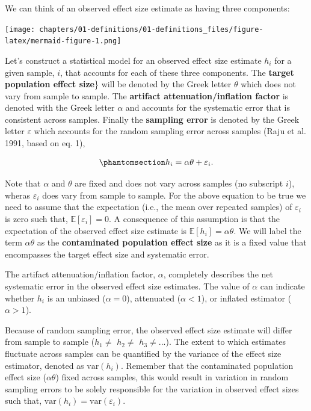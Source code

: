 \documentclass[
  letterpaper,
  DIV=11,
  numbers=noendperiod]{scrreprt}
\begin{document}
We can think of an observed effect size estimate as having three
components:

\texttt{[image: chapters/01-definitions/01-definitions\_files/figure-latex/mermaid-figure-1.png]}

Let's construct a statistical model for an observed effect size estimate
\(h_i\) for a given sample, \(i\), that accounts for each of these three
components. The \textbf{target population effect size}\} will be denoted
by the Greek letter \(\theta\) which does not vary from sample to
sample. The \textbf{artifact attenuation/inflation factor} is denoted
with the Greek letter \(\alpha\) and accounts for the systematic error
that is consistent across samples. Finally the \textbf{sampling error}
is denoted by the Greek letter \(\varepsilon\) which accounts for the
random sampling error across samples (Raju et al. 1991, based on eq. 1),

\begin{equation}\phantomsection\label{eq-model}{
h_i = \alpha \theta + \varepsilon_i.
}\end{equation}

Note that \(\alpha\) and \(\theta\) are fixed and does not vary across
samples (no subscript \(i\)), wheras \(\varepsilon_i\) does vary from
sample to sample. For the above equation to be true we need to assume
that the expectation (i.e., the mean over repeated samples) of
\(\varepsilon_i\) is zero such that, \(\mathbb{E}[\varepsilon_i] = 0\).
A consequence of this assumption is that the expectation of the observed
effect size estimate is \(\mathbb{E}[h_i]=\alpha \theta\). We will label
the term \(\alpha \theta\) as the \textbf{contaminated population effect
size} as it is a fixed value that encompasses the target effect size and
systematic error.

The artifact attenuation/inflation factor, \(\alpha\), completely
describes the net systematic error in the observed effect size
estimates. The value of \(\alpha\) can indicate whether \(h_i\) is an
unbiased (\(\alpha = 0\)), attenuated (\(\alpha < 1\)), or inflated
estimator (\(\alpha > 1\)).

Because of random sampling error, the observed effect size estimate will
differ from sample to sample (\(h_1\neq\) \(h_2\neq\) \(h_3\neq...\)).
The extent to which estimates fluctuate across samples can be quantified
by the variance of the effect size estimator, denoted as
\(\text{var}(h_i)\). Remember that the contaminated population effect
size (\(\alpha \theta\)) fixed across samples, this would result in
variation in random sampling errors to be solely responsible for the
variation in observed effect sizes such that,
\(\text{var}(h_i)=\text{var}(\varepsilon_i)\).
\end{document}
